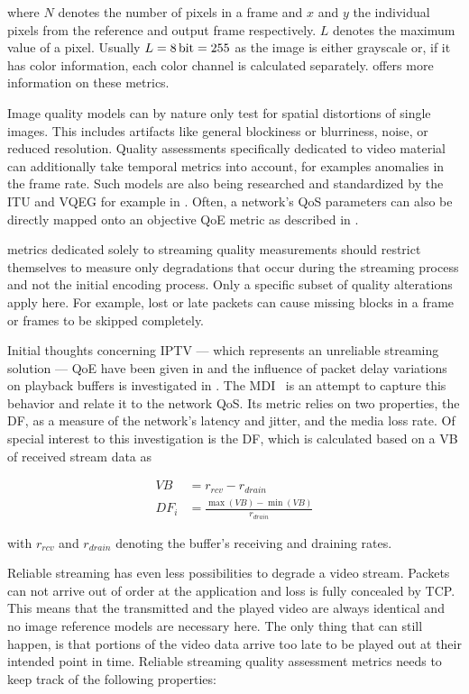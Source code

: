where $N$ denotes the number of pixels in a frame and $x$ and $y$ the individual pixels from the reference and output frame respectively. $L$ denotes the maximum value of a pixel. Usually $L = \SI{8}{\bit} = 255$ as the image is either grayscale or, if it has color information, each color channel is calculated separately. \cite{objective-vqa} offers more information on these metrics.

Image quality models can by nature only test for spatial distortions of single images. This includes artifacts like general blockiness or blurriness, noise, or reduced resolution. Quality assessments specifically dedicated to video material can additionally take temporal metrics into account, for examples anomalies in the frame rate. Such models are also being researched and standardized by the \gls{ITU} and \gls{VQEG} for example in \cite{ituJ144, ituJ246, ituJ247}. Often, a network's \gls{QoS} parameters can also be directly mapped onto an objective \gls{QoE} metric as described in \cite{5430142}.

metrics dedicated solely to streaming quality measurements should restrict themselves to measure only degradations that occur during the streaming process and not the initial encoding process. Only a specific subset of quality alterations apply here. For example, lost or late packets can cause missing blocks in a frame or frames to be skipped completely. 

Initial thoughts concerning \gls{IPTV} --- which represents an unreliable streaming solution --- \gls{QoE} have been given in \cite{ituG1080} and the influence of packet delay variations on playback buffers is investigated in \cite{rfc3393}. The \gls{MDI}~\cite{rfc4445} is an attempt to capture this behavior and relate it to the network \gls{QoS}. Its metric relies on two properties, the \gls{DF}, as a measure of the network's latency and jitter, and the media loss rate. Of special interest to this investigation is the \gls{DF}, which is calculated based on a \gls{VB} of received stream data as


\begin{align}
	VB &= r_{rcv} - r_{drain} \\
	DF_i &= \frac{\max(VB) - \min(VB)}{r_{drain}}
\end{align}

with $r_{rcv}$ and $r_{drain}$ denoting the buffer's receiving and draining rates.

Reliable streaming has even less possibilities to degrade a video stream. Packets can not arrive out of order at the application and loss is fully concealed by \gls{TCP}. This means that the transmitted and the played video are always identical and no image reference models are necessary here. The only thing that can still happen, is that portions of the video data arrive too late to be played out at their intended point in time. Reliable streaming quality assessment metrics needs to keep track of the following properties:

